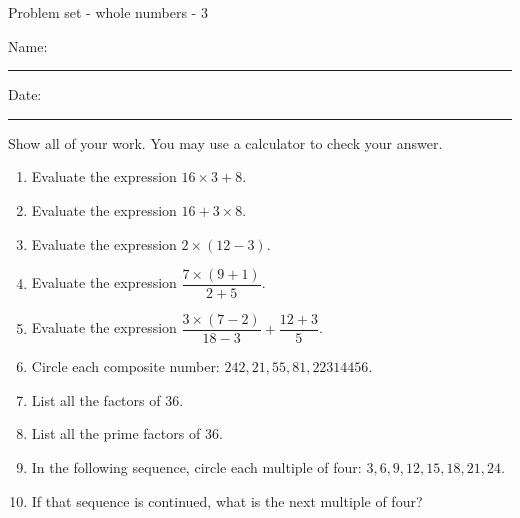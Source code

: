 \documentclass[12pt]{article}
\begin{document}
\pagestyle{empty} %
\begin{center}
          Problem set - whole numbers - 3 \\[0.5in]
\end{center}
Name: \rule{4in}{0.005in} Date: \rule{1.5in}{0.005in} 
  \vspace{0.25in}

Show all of your work. You may use a calculator to check your answer. 

\begin{enumerate}

\item Evaluate the expression $16\times3+8$.
  \vspace{0.5in}

\item Evaluate the expression $16+3\times8$.
  \vspace{0.5in}

\item Evaluate the expression $2\times(12-3)$.
  \vspace{0.5in}

\item Evaluate the expression $\dfrac{7\times(9+1)}{2+5}$.
  \vspace{0.5in}

\item Evaluate the expression $\dfrac{3\times(7-2)}{18-3}+\dfrac{12+3}{5}$.
  \vspace{0.5in}

\item Circle each composite number: $242,21,55,81,22314456$.
  \vspace{0.5in}
  \vspace{0.5in}

\item List all the factors of 36.
  \vspace{0.5in}
  \vspace{0.5in}

\item List all the prime factors of 36.
  \vspace{0.5in}
  \vspace{0.5in}

\item In the following sequence, circle each multiple of four: $3,6,9,12,15,18,21,24$.
  \vspace{0.5in}
  \vspace{0.5in}

\item If that sequence is continued, what is the next multiple of four? 
  \vspace{0.5in}
  \vspace{0.5in}


\end{enumerate}
\end{document}
